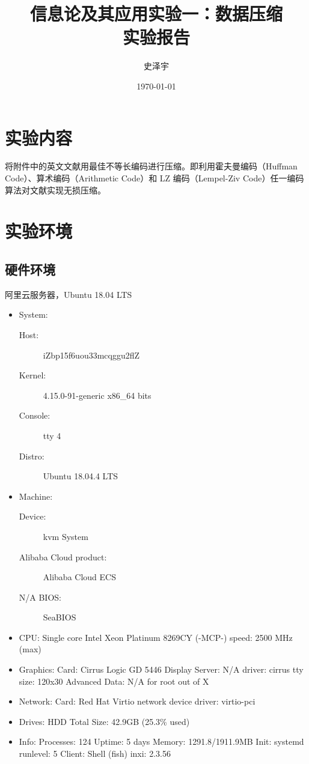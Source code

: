 \documentclass{ctexart}
\title{信息论及其应用实验一：数据压缩 \\ 实验报告}
\author{史泽宇}
\date{\today}
\begin{document}
\maketitle

\section{实验内容}

将附件中的英文文献用最佳不等长编码进行压缩。即利用霍夫曼编码（Huffman Code）、算术编码（Arithmetic Code）和 LZ 编码（Lempel-Ziv Code）任一编码算法对文献实现无损压缩。

\section{实验环境}

\subsection{硬件环境}

阿里云服务器，Ubuntu 18.04 LTS

\begin{itemize}
    \item System:
        \begin{description}
            \item[Host:] iZbp15f6uou33mcqggu2flZ
            \item[Kernel:] 4.15.0-91-generic x86\_64 bits
            \item[Console:] tty 4
            \item[Distro:] Ubuntu 18.04.4 LTS
        \end{description}
    \item Machine:
        \begin{description}
            \item[Device:] kvm System
            \item[Alibaba Cloud product:] Alibaba Cloud ECS
            \item[N/A BIOS:] SeaBIOS
        \end{description}
    \item CPU: Single core Intel Xeon Platinum 8269CY (-MCP-) speed: 2500 MHz (max)
    \item Graphics: Card: Cirrus Logic GD 5446 Display Server: N/A driver: cirrus tty size: 120x30 Advanced Data: N/A for root out of X
    \item Network: Card: Red Hat Virtio network device driver: virtio-pci
    \item Drives: HDD Total Size: 42.9GB (25.3\% used)
    \item Info: Processes: 124 Uptime: 5 days Memory: 1291.8/1911.9MB Init: systemd runlevel: 5 Client: Shell (fish) inxi: 2.3.56
\end{itemize}
\end{document}
